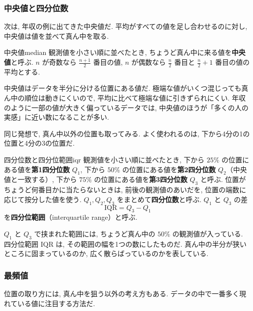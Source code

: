     \subsubsection*{中央値と四分位数}

    次は, 年収の例に出てきた中央値だ.
    平均がすべての値を足し合わせるのに対し, 中央値は値を並べて真ん中を取る.

    \begin{defi}{中央値}{median}
      観測値を小さい順に並べたとき, ちょうど真ん中に来る値を\textbf{中央値}と呼ぶ.
      $n$ が奇数なら $\frac{n+1}{2}$ 番目の値,
      $n$ が偶数なら $\frac{n}{2}$ 番目と $\frac{n}{2}+1$ 番目の値の平均とする.
    \end{defi}

    中央値はデータを半分に分ける位置にある値だ.
    極端な値がいくつ混じっても真ん中の順位は動きにくいので, 平均に比べて極端な値に引きずられにくい.
    年収のように一部の値が大きく偏っているデータでは, 中央値のほうが「多くの人の実感」に近い数になることが多い.

    同じ発想で, 真ん中以外の位置も取ってみる.
    よく使われるのは, 下から4分の1の位置と4分の3の位置だ.

    \begin{defi}{四分位数と四分位範囲}{iqr}
      観測値を小さい順に並べたとき, 下から $25\%$ の位置にある値を\textbf{第1四分位数} $Q_1$,
      下から $50\%$ の位置にある値を\textbf{第2四分位数} $Q_2$（中央値と一致する）,
      下から $75\%$ の位置にある値を\textbf{第3四分位数} $Q_3$ と呼ぶ.
      位置がちょうど何番目かに当たらないときは, 前後の観測値のあいだを, 位置の端数に応じて按分した値を使う.
      $Q_1, Q_2, Q_3$ をまとめて\textbf{四分位数}と呼ぶ.
      $Q_1$ と $Q_3$ の差
      \[
        \mathrm{IQR} = Q_3 - Q_1
      \]
      を\textbf{四分位範囲}（interquartile range）と呼ぶ.
    \end{defi}

    $Q_1$ と $Q_3$ で挟まれた範囲には, ちょうど真ん中の $50\%$ の観測値が入っている.
    四分位範囲 $\mathrm{IQR}$ は, その範囲の幅を1つの数にしたものだ.
    真ん中の半分が狭いところに固まっているのか, 広く散らばっているのかを表している.

    \subsubsection*{最頻値}

    位置の取り方には, 真ん中を狙う以外の考え方もある.
    データの中で一番多く現れている値に注目する方法だ.

